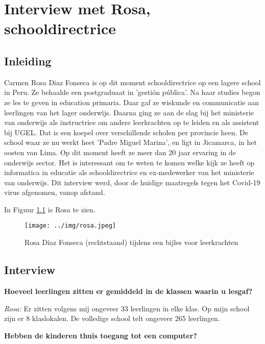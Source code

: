 
\chapter{Interview met Rosa, schooldirectrice}
\label{ch:interviewRosa}

\section{Inleiding}
Carmen Rosa Diaz Fonseca is op dit moment schooldirectrice op een lagere school in Peru. Ze behaalde een postgraduaat in 'gestión pública'. Na haar studies begon ze les te geven in education primaria. Daar gaf ze wiskunde en communicatie aan leerlingen van het lager onderwijs. Daarna ging ze aan de slag bij het ministerie van onderwijs als instructrice om andere leerkrachten op te leiden en als assistent bij UGEL. Dat is een koepel over verschillende scholen per provincie heen. De school waar ze nu werkt heet 'Padre Miguel Marina', en ligt in Jicamarca, in het oosten van Lima. Op dit moment heeft ze meer dan 20 jaar ervaring in de onderwijs sector. Het is interessant om te weten te komen welke kijk ze heeft op informatica in educatie als schooldirectrice en ex-medewerker van het ministerie van onderwijs. Dit interview werd, door de huidige maatregels tegen het Covid-19 virus afgenomen, vanop afstand.

In Figuur \ref{rosa} is Rosa te zien.

\begin{figure}[h!]
	\texttt{[image: ../img/rosa.jpeg]}
	\caption{Rosa Diaz Fonseca (rechtstaand) tijdens een bijles voor leerkrachten }
	\label{rosa}
\end{figure}


\section{Interview}

\textbf{Hoeveel leerlingen zitten er gemiddeld in de klassen waarin u lesgaf?}

\textit{Rosa:} Er zitten volgens mij ongeveer 33 leerlingen in elke klas. Op mijn school zijn er 8 klaslokalen. De volledige school telt ongeveer 265 leerlingen.

\textbf{Hebben de kinderen thuis toegang tot een computer?}

